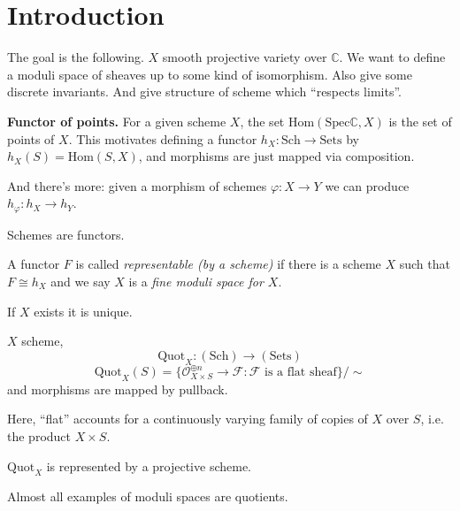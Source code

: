 \section{Introduction}
\label{section-introduction}

The goal is the following. $X$ smooth
projective variety over $\mathbb{C}$. We want
to define a moduli space of sheaves up to
some kind of isomorphism. Also give some
discrete invariants. And give structure of
scheme which ``respects limits''.

{\bf Functor of points.} For a given scheme
$X$, the set
$\text{Hom}(\text{Spec}\mathbb{C},X)$ is the
set of points of $X$. This motivates defining
a functor $h_X:\text{Sch}\to \text{Sets}$ by
$h_X(S)=\text{Hom}(S,X)$, and morphisms are
just mapped via composition.

And there's more: given a morphism of schemes
$\varphi:X\to Y$ we can produce
$h_\varphi:h_X \to h_Y$.

\begin{slogan}
Schemes are functors.
\end{slogan}

\begin{definition}
\label{msos-label-001}
A functor $F$ is called {\it representable
(by a scheme)} if there is a scheme $X$ such
that $F\cong h_X$ and we say $X$ is a {\it
fine moduli space for $X$}.
\end{definition}

\begin{remark}
\label{msos-label-002}
If $X$ exists it is unique.
\end{remark}

\begin{example}
\label{example-quotient-sheaf}
$X$ scheme,
$$
\text{Quot}_X:(\text{Sch})\to (\text{Sets})
$$
$$
\text{Quot}_X(S)=\{
\mathcal{O}_{X \times S}^{\oplus
n}\to\mathcal{F}
:\mathcal{F} \text{ is a flat sheaf}\}\Big/
\sim
$$
and morphisms are mapped by pullback.
\end{example}

Here, ``flat'' accounts for a continuously
varying family of copies of $X$ over $S$,
i.e. the product $X \times S$.

\begin{theorem}
\label{theorem-Quot-is-represented}
$\text{Quot}_X$ is represented by a
projective scheme.
\end{theorem}

Almost all examples of moduli spaces are
quotients.

\medskip\noindent

